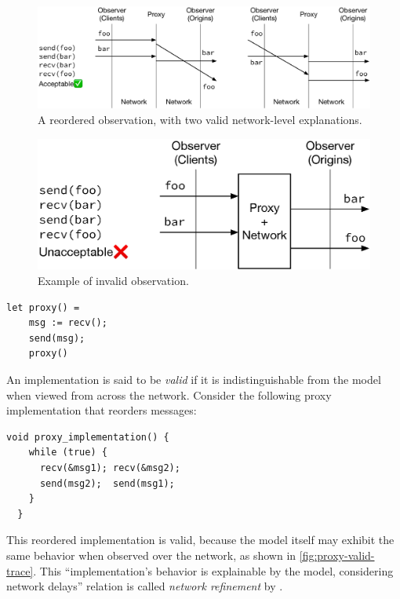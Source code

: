 \begin{figure}
  \includegraphics[width=\linewidth]{figures/proxy-valid-trace}
  \caption{A reordered observation, with two valid network-level explanations.}
  \label{fig:proxy-valid-trace}
\end{figure}

\begin{figure}
  \includegraphics[width=0.7\linewidth]{figures/proxy-invalid-trace}
  \caption{Example of invalid observation.}
  \label{fig:proxy-invalid-trace}
\end{figure}

\begin{lstlisting}[style=customcoq]
let proxy() =
    msg := recv();
    send(msg);
    proxy()
\end{lstlisting}

An implementation is said to be {\em valid} if it is indistinguishable from
the model when viewed from across the network.  Consider
the following proxy implementation that reorders messages:

\begin{lstlisting}[style=customc]
  void proxy_implementation() {
    while (true) {
      recv(&msg1); recv(&msg2);
      send(msg2);  send(msg1);
    }
  }
\end{lstlisting}
This reordered implementation is valid, because the model itself may
exhibit the same behavior when observed over the network, as shown in
\autoref{fig:proxy-valid-trace}.  This ``implementation's behavior is
explainable by the model, considering network delays''
relation is called {\em network refinement} by
\textcite{cpp19}.


